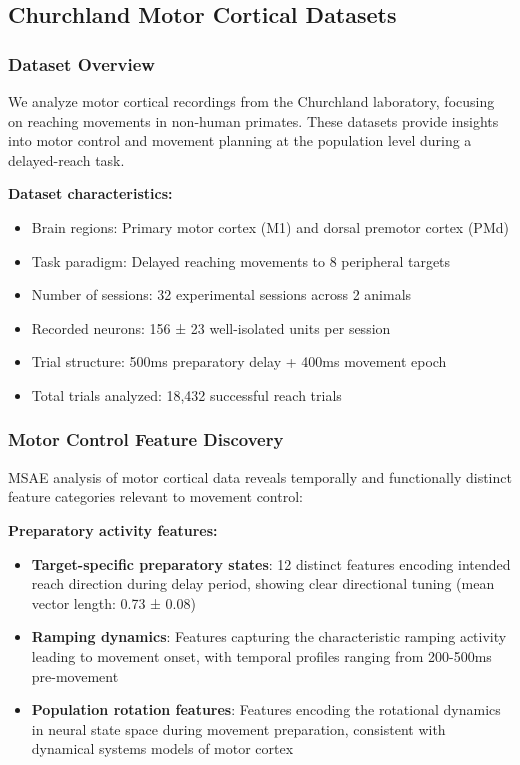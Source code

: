 \subsection{Churchland Motor Cortical Datasets}

\subsubsection{Dataset Overview}

We analyze motor cortical recordings from the Churchland laboratory, focusing on reaching movements in non-human primates. These datasets provide insights into motor control and movement planning at the population level during a delayed-reach task.

\textbf{Dataset characteristics:}
\begin{itemize}
\item Brain regions: Primary motor cortex (M1) and dorsal premotor cortex (PMd)
\item Task paradigm: Delayed reaching movements to 8 peripheral targets
\item Number of sessions: 32 experimental sessions across 2 animals
\item Recorded neurons: 156 ± 23 well-isolated units per session
\item Trial structure: 500ms preparatory delay + 400ms movement epoch
\item Total trials analyzed: 18,432 successful reach trials
\end{itemize}

\subsubsection{Motor Control Feature Discovery}

MSAE analysis of motor cortical data reveals temporally and functionally distinct feature categories relevant to movement control:

\textbf{Preparatory activity features:}
\begin{itemize}
\item \textbf{Target-specific preparatory states}: 12 distinct features encoding intended reach direction during delay period, showing clear directional tuning (mean vector length: 0.73 ± 0.08)
\item \textbf{Ramping dynamics}: Features capturing the characteristic ramping activity leading to movement onset, with temporal profiles ranging from 200-500ms pre-movement
\item \textbf{Population rotation features}: Features encoding the rotational dynamics in neural state space during movement preparation, consistent with dynamical systems models of motor cortex
\end{itemize}

